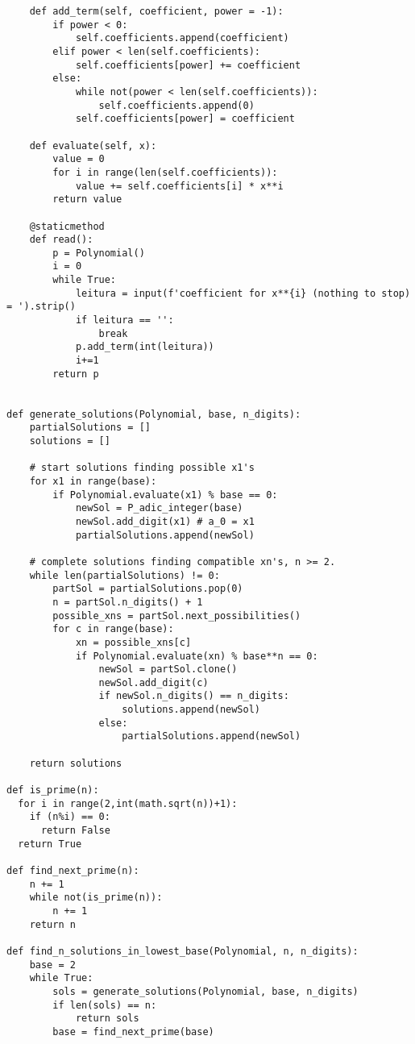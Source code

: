 \documentclass{report}
\begin{document}
\begin{verbatim}
    def add_term(self, coefficient, power = -1):
        if power < 0:
            self.coefficients.append(coefficient)
        elif power < len(self.coefficients):
            self.coefficients[power] += coefficient
        else:
            while not(power < len(self.coefficients)):
                self.coefficients.append(0)
            self.coefficients[power] = coefficient
    
    def evaluate(self, x):
        value = 0
        for i in range(len(self.coefficients)):
            value += self.coefficients[i] * x**i
        return value

    @staticmethod
    def read():
        p = Polynomial()
        i = 0
        while True:
            leitura = input(f'coefficient for x**{i} (nothing to stop) = ').strip()
            if leitura == '':
                break
            p.add_term(int(leitura))
            i+=1
        return p


def generate_solutions(Polynomial, base, n_digits):
    partialSolutions = []
    solutions = []

    # start solutions finding possible x1's
    for x1 in range(base):
        if Polynomial.evaluate(x1) % base == 0:
            newSol = P_adic_integer(base)
            newSol.add_digit(x1) # a_0 = x1
            partialSolutions.append(newSol)
    
    # complete solutions finding compatible xn's, n >= 2.
    while len(partialSolutions) != 0:
        partSol = partialSolutions.pop(0)
        n = partSol.n_digits() + 1
        possible_xns = partSol.next_possibilities()
        for c in range(base):
            xn = possible_xns[c]
            if Polynomial.evaluate(xn) % base**n == 0:
                newSol = partSol.clone()
                newSol.add_digit(c)
                if newSol.n_digits() == n_digits:
                    solutions.append(newSol)
                else:
                    partialSolutions.append(newSol)
    
    return solutions

def is_prime(n):
  for i in range(2,int(math.sqrt(n))+1):
    if (n%i) == 0:
      return False
  return True

def find_next_prime(n):
    n += 1
    while not(is_prime(n)):
        n += 1
    return n

def find_n_solutions_in_lowest_base(Polynomial, n, n_digits):
    base = 2
    while True:
        sols = generate_solutions(Polynomial, base, n_digits)
        if len(sols) == n:
            return sols
        base = find_next_prime(base)



\end{verbatim}
\end{document}
